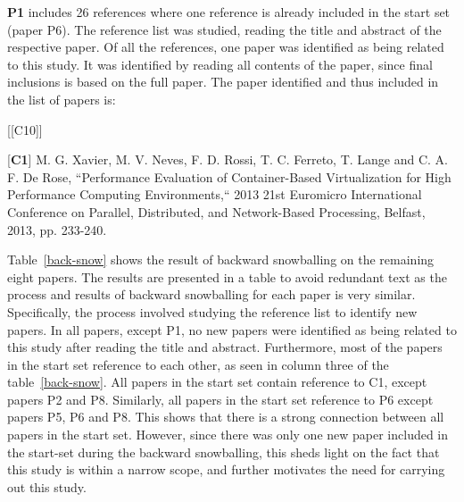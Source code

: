 \textbf{P1} includes 26 references where one reference is already included in the start set (paper P6). The reference list was studied, reading the title and abstract of the respective paper. Of all the references, one paper was identified as being related to this study. It was identified by reading all contents of the paper, since final inclusions is based on the full paper. The paper identified and thus included in the list of papers is: \\

\begin{labeling}{[{[}C10{]}]}
\item [{[}\textbf{C1}{]}]  M. G. Xavier, M. V. Neves, F. D. Rossi, T. C. Ferreto, T. Lange and C. A. F. De Rose, “Performance Evaluation of Container-Based Virtualization for High Performance Computing Environments,“ 2013 21st Euromicro International Conference on Parallel, Distributed, and Network-Based Processing, Belfast, 2013, pp. 233-240.
\item
\end{labeling}

Table~\ref{back-snow} shows the result of backward snowballing on the remaining eight papers. The results are presented in a table to avoid redundant text as the process and results of backward snowballing for each paper is very similar. Specifically, the process involved studying the reference list to identify new papers. In all papers, except P1, no new papers were identified as being related to this study after reading the title and abstract. Furthermore, most of the papers in the start set reference to each other, as seen in column three of the table~\ref{back-snow}. All papers in the start set contain reference to C1, except papers P2 and P8. Similarly, all papers in the start set reference to P6 except papers P5, P6 and P8. This shows that there is a strong connection between all papers in the start set. However, since there was only one new paper included in the start-set during the backward snowballing, this sheds light on the fact that this study is within a narrow scope, and further motivates the need for carrying out this study. 

